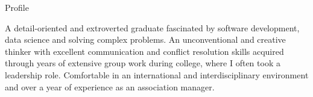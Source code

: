 \documentclass[
	11pt, %
]{cv} %
\begin{document}
\begin{rSection}{Profile}
	
A detail-oriented and extroverted graduate fascinated by software development, data science and solving complex problems. An unconventional and creative thinker with excellent communication and conflict resolution skills acquired through years of extensive group work during college, where I often took a leadership role. Comfortable in an international and interdisciplinary environment and over a year of experience as an association manager.

\end{rSection}

\end{document}
